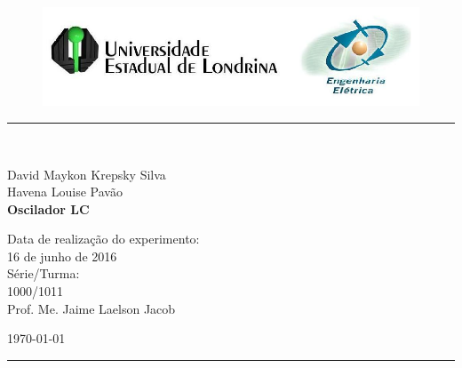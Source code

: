 \begin{titlepage}
\begin{center}
\begin{figure}[h]
\includegraphics[scale=0.76]{Imagens/topdotitulo.png}
\end{figure}
\rule{\columnwidth}{1.5mm}
\

\large David Maykon Krepsky Silva\\
\large Havena Louise Pavão\\

\vspace{4cm}
{\bf \Large Oscilador LC}
\vspace{3.5cm}

\begin{flushright}
Data de realização do experimento:\\
16 de junho de 2016\\
Série/Turma:\\
1000/1011\\
Prof. Me. Jaime Laelson Jacob 
\end{flushright}

\vspace{3.2cm}
\today

\rule{\columnwidth}{1.3mm}
\end{center}
\end{titlepage}